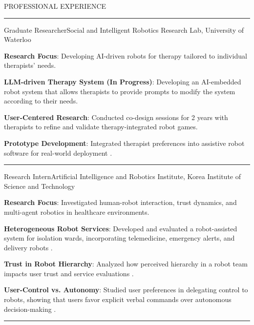 \documentclass{resume} %
\renewenvironment{rSection}[1]{
\sectionskip
\textcolor{CarnegieMellonRed}{\MakeUppercase{#1}}
\sectionlineskip
\hrule
\begin{list}{}{
\setlength{\leftmargin}{1.5em}
}
\item[]
}{
\end{list}
}
\begin{document}
\begin{rSection}{Professional Experience}

\begin{rSubsection}{Graduate Researcher}{Social and Intelligent Robotics Research Lab, University of Waterloo}{}{}
    \item \textbf{Research Focus}: Developing AI-driven robots for therapy tailored to individual therapists' needs.
    
    \item \textbf{LLM-driven Therapy System (In Progress)}: Developing an AI-embedded robot system that allows therapists to provide prompts to modify the system according to their needs.
    \item \textbf{User-Centered Research}: Conducted co-design sessions for 2 years with therapists to refine and validate therapy-integrated robot games.
    \item \textbf{Prototype Development}: Integrated therapist preferences into assistive robot software for real-world deployment \cite{Kickstart}.
\end{rSubsection}

\vspace{2pt}
{\color{gray} \noindent\rule{\linewidth}{0.1pt}} %

\begin{rSubsection}{Research Intern}{Artificial Intelligence and Robotics Institute, Korea Institute of Science and Technology}{}{}
    \item \textbf{Research Focus}: Investigated human-robot interaction, trust dynamics, and multi-agent robotics in healthcare environments.
    \item \textbf{Heterogeneous Robot Services}: Developed and evaluated a robot-assisted system for isolation wards, incorporating telemedicine, emergency alerts, and delivery robots \cite{kwon2023heterogeneous}.
    \item \textbf{Trust in Robot Hierarchy}: Analyzed how perceived hierarchy in a robot team impacts user trust and service evaluations \cite{shin2023hierarchies}.
    \item \textbf{User-Control vs. Autonomy}: Studied user preferences in delegating control to robots, showing that users favor explicit verbal commands over autonomous decision-making \cite{shin2023robot}.
\end{rSubsection}

\vspace{2pt}
{\color{gray} \noindent\rule{\linewidth}{0.1pt}} %


\end{rSection}
\end{document}

